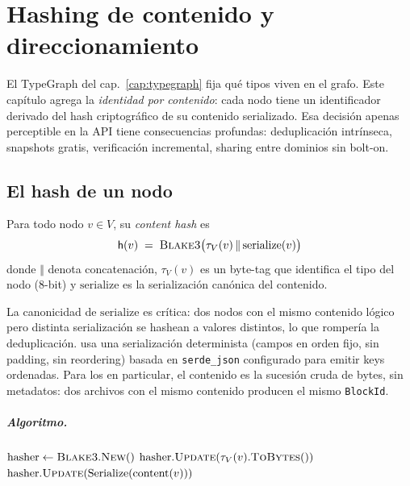 \chapter{Hashing de contenido y direccionamiento}
\label{cap:hashing}

El TypeGraph del cap.~\ref{cap:typegraph} fija qué tipos viven en el
grafo. Este capítulo agrega la \emph{identidad por contenido}: cada
nodo tiene un identificador derivado del hash criptográfico de su
contenido serializado. Esa decisión apenas perceptible en la API tiene
consecuencias profundas: deduplicación intrínseca, snapshots gratis,
verificación incremental, sharing entre dominios sin bolt-on.

\section{El hash de un nodo}

\begin{defn}
\label{def:content-hash}
Para todo nodo $v \in V$, su \emph{content hash} es
\[
  \mathsf{h}(v) \;=\; \textsc{Blake3}\bigl(\tau_V(v) \,\Vert\, \mathrm{serialize}(v)\bigr)
\]
donde $\Vert$ denota concatenación, $\tau_V(v)$ es un byte-tag que
identifica el tipo del nodo (8-bit) y $\mathrm{serialize}$ es la
serialización canónica del contenido.
\end{defn}

La canonicidad de $\mathrm{serialize}$ es crítica: dos nodos con el
mismo contenido lógico pero distinta serialización se hashean a valores
distintos, lo que rompería la deduplicación. 
usa una serialización determinista (campos en orden fijo, sin padding,
sin reordering) basada en \texttt{serde\_json} configurado para emitir
keys ordenadas. Para los \NBlk{} en particular, el contenido es la
sucesión cruda de bytes, sin metadatos: dos archivos con el mismo
contenido producen el mismo \texttt{BlockId}.

\paragraph{Algoritmo.}

\begin{algorithm}[H]
\SetAlgoLined
{}
\caption{\textsc{NodeHash}}\label{alg:node-hash}

$\mathrm{hasher} \gets \textsc{Blake3}.\textsc{New}()$\;
$\mathrm{hasher}.\textsc{Update}(\tau_V(v).\textsc{ToBytes}())$\;
$\mathrm{hasher}.\textsc{Update}(\mathrm{Serialize}(\mathrm{content}(v)))$\;
\;
\end{algorithm}

